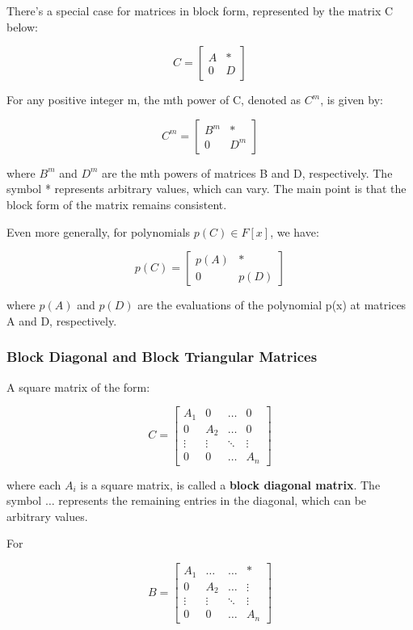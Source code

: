 \documentclass [12pt]{article}
\begin{document}
There's a special case for matrices in block form, represented by the matrix
C below: 

\[C=
\begin {bmatrix}
A&*\\
0&D%
\end {bmatrix}
 \]
 

For any positive integer m, the mth power of C, denoted as \(C^m\), is given
by: 

\[C^m=
\begin {bmatrix}
B^m&*\\
0&D^m%
\end {bmatrix}
 \]
 

where \(B^m\) and \(D^m\) are the mth powers of matrices B and D, respectively.
The symbol * represents arbitrary values, which can vary. The main point
is that the block form of the matrix remains consistent. 

Even more generally, for polynomials \(p(C)\in F[x]\), we have: 

\[p(C)=
\begin {bmatrix}
p(A)&*\\
0&p(D)%
\end {bmatrix}
 \]
 

where \(p(A)\) and \(p(D)\) are the evaluations of the polynomial p(x) at
matrices A and D, respectively. 


\subsubsection {Block Diagonal and Block Triangular Matrices} 

A square matrix of the form: 

\[C=
\begin {bmatrix}
A_1&0&\ldots &0\\
0&A_2&\ldots &0\\
\vdots &\vdots &\ddots &\vdots \\
0&0&\ldots &A_n%
\end {bmatrix}
 \]
 

where each \(A_i\) is a square matrix, is called a \textbf{block diagonal
matrix}. The symbol \(\ldots \) represents the remaining entries in the
diagonal, which can be arbitrary values. 

For 

\[B=
\begin {bmatrix}
A_1&\ldots &\ldots &*\\
0&A_2&\ldots &\vdots \\
\vdots &\vdots &\ddots &\vdots \\
0&0&\ldots &A_n%
\end {bmatrix}
 \]
 
\end{document}
